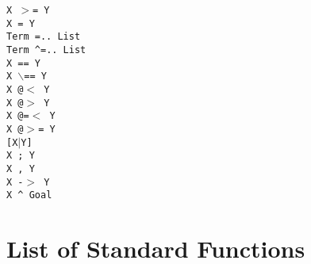 \begin{tabbing}
 \> {\tt X $>$= Y}		\>					\\
 \> {\tt X = Y}			\>					\\
 \> {\tt Term =.. List}		\>					\\
 \> {\tt Term \verb'^'=.. List}	\>					\\
 \> {\tt X == Y}		\>					\\
 \> {\tt X $\backslash$== Y}	\>					\\
 \> {\tt X @$<$ Y}		\>					\\
 \> {\tt X @$>$ Y}		\>					\\
 \> {\tt X @=$<$ Y}		\>					\\
 \> {\tt X @$>$= Y}		\>					\\
 \> {\tt [X$|$Y]}		\>					\\
 \> {\tt X ; Y}			\>					\\
 \> {\tt X , Y}			\>					\\
 \> {\tt X -$>$ Y}		\>					\\
 \> {\tt X \verb'^' Goal}	\>					\\
\end{tabbing}



\section{List of Standard Functions}


